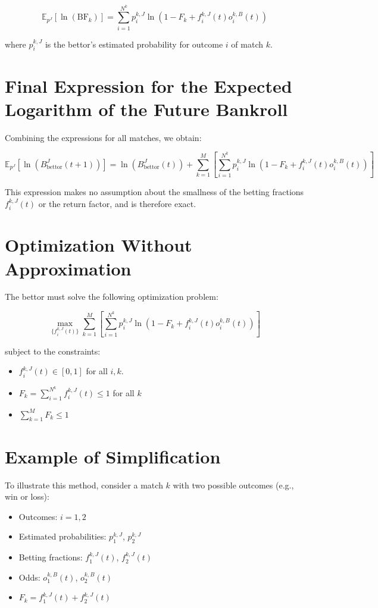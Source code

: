 \[
\mathbb{E}_{p^{J}}\left[ \ln\left( \text{BF}_k \right) \right] = \sum_{i=1}^{N^k} p_i^{k,J} \ln\left( 1 - F_k + f_i^{k,J}(t) o_i^{k,B}(t) \right)
\]

where \( p_i^{k,J} \) is the bettor's estimated probability for outcome \( i \) of match \( k \).

\section{Final Expression for the Expected Logarithm of the Future Bankroll}

Combining the expressions for all matches, we obtain:

\[
\mathbb{E}_{p^{J}}\left[ \ln\left( B_{\text{bettor}}^J(t+1) \right) \right] = \ln\left( B_{\text{bettor}}^J(t) \right) + \sum_{k=1}^M \left[ \sum_{i=1}^{N^k} p_i^{k,J} \ln\left( 1 - F_k + f_i^{k,J}(t) o_i^{k,B}(t) \right) \right]
\]

This expression makes no assumption about the smallness of the betting fractions \( f_i^{k,J}(t) \) or the return factor, and is therefore exact.

\section{Optimization Without Approximation}

The bettor must solve the following optimization problem:

\[
\max_{\{ f_i^{k,J}(t) \}} \sum_{k=1}^M \left[ \sum_{i=1}^{N^k} p_i^{k,J} \ln\left( 1 - F_k + f_i^{k,J}(t) o_i^{k,B}(t) \right) \right]
\]

subject to the constraints:

\begin{itemize}
    \item \( f_i^{k,J}(t) \in [0, 1] \) for all \( i, k \).
    \item \( F_k = \sum_{i=1}^{N^k} f_i^{k,J}(t) \leq 1 \) for all \( k \)
    \item  \( \sum_{k=1}^M F_k \leq 1 \)
\end{itemize}


\section{Example of Simplification}

To illustrate this method, consider a match \( k \) with two possible outcomes (e.g., win or loss):

\begin{itemize}
\item Outcomes: \( i = 1, 2 \)
\item Estimated probabilities: \( p_1^{k,J} \), \( p_2^{k,J} \)
\item Betting fractions: \( f_1^{k,J}(t) \), \( f_2^{k,J}(t) \)
\item Odds: \( o_1^{k,B}(t) \), \( o_2^{k,B}(t) \)
\item \( F_k = f_1^{k,J}(t) + f_2^{k,J}(t) \)
\end{itemize}

